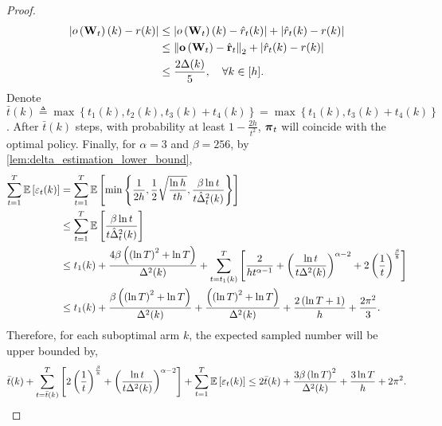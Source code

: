 \begin{proof}
	\begin{equation*}
	\begin{split}
	\left| o\left( {\mathbf{W}}_t \right)(k) - r(k) \right| &\le \left| o\left( {\mathbf{W}}_t \right)(k) - \hat{r}_t(k) \right| + \left| \hat{r}_t(k) - r(k) \right| \\
	&\le \left\| {\mathbf{o}}\left( {\mathbf{W}}_t \right) - \hat{{\mathbf{r}}}_t\right\|_2 + \left| \hat{r}_t(k) - r(k) \right| \\
	&\le \frac{2 \Delta(k)}{5}, \quad \forall k \in [h].
	\end{split}
	\end{equation*}
	Denote $\bar{t}(k) \triangleq \max\left\{ t_1(k), t_2(k), t_3(k) + t_4(k) \right\} = \max\left\{ t_1(k), t_3(k) + t_4(k) \right\} $. After $\bar{t}(k)$ steps, with probability at least $1 - \frac{2 h}{t^2}$, ${\boldsymbol{\pi}}_t$ will coincide with the optimal policy. Finally, for $\alpha = 3$ and $\beta = 256$, by \cref{lem:delta_estimation_lower_bound},
	\begin{equation*}
	\begin{split}
	\sum\limits_{t=1}^{T}{ \operatorname*{{\mathbb{E}}}{ \left[ \varepsilon_t(k) \right]} } &= \sum\limits_{t=1}^{T}{ \operatorname*{{\mathbb{E}}}{ \left[ \min\left\{ \frac{1}{2 h}, \frac{1}{2} \sqrt{\frac{\ln{h}}{ t h}},  \frac{\beta \ln{t}}{t \hat{\Delta}_t^2(k)} \right\} \right]} } \\
	&\le \sum\limits_{t=1}^{T}{ \operatorname*{{\mathbb{E}}}{ \left[  \frac{\beta \ln{t}}{t \hat{\Delta}_t^2(k)} \right]} } \\
	&\le t_1(k) + \frac{ 4 \beta \left( \left( \ln{T}\right)^2 + \ln{T} \right)}{\Delta^2(k)} + \sum\limits_{t = t_1(k)}^{T}{ \left[ \frac{2}{ h t^{\alpha-1}} + \left( \frac{\ln{t}}{t \Delta^2(k)} \right)^{\alpha - 2} + 2 \left(\frac{1}{t}\right)^{\frac{\beta}{8}} \right] } \\
	&\le t_1(k) + \frac{\beta \left( \left( \ln{T}\right)^2 + \ln{T} \right)}{\Delta^2(k)} + \frac{ \left( \left( \ln{T}\right)^2 + \ln{T} \right)}{\Delta^2(k)} + \frac{2 \left( \ln{T} + 1\right)}{h} + \frac{2 \pi^2}{3}.
	\end{split}
	\end{equation*}
	Therefore, for each suboptimal arm $k$, the expected sampled number will be upper bounded by,
	\begin{equation*}
	\begin{split}
	\bar{t}(k) + \sum\limits_{t = \bar{t}(k) }^{T}{ \left[ 2 \left(\frac{1}{t}\right)^{\frac{\beta}{8}} + \left( \frac{\ln{t}}{t \Delta^2(k)} \right)^{\alpha - 2} \right] } + \sum\limits_{t=1}^{T}{ \operatorname*{{\mathbb{E}}}{ \left[ \varepsilon_t(k) \right]} } \le 2 \bar{t}(k) + \frac{ 3 \beta \left( \ln{T} \right)^2}{\Delta^2(k)} + \frac{3 \ln{T}}{h} + 2 \pi^2.
	\end{split}
	\end{equation*}
\end{proof}

